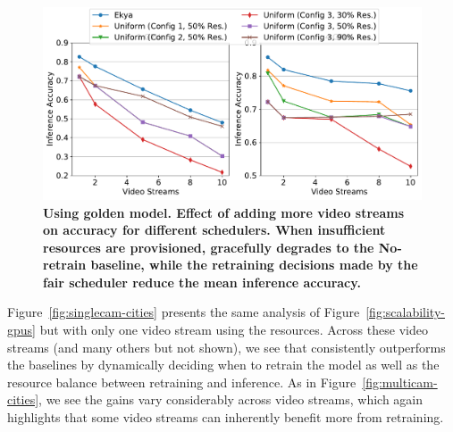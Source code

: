 \begin{figure}
 	\includegraphics[width=\linewidth]{results/scalability/scalability_cams_fixedGPUs_cityscapes_golden_model.pdf}
	\caption{\bf Using golden model. Effect of adding more video streams on accuracy for different schedulers. When insufficient resources are provisioned, \name{} gracefully degrades to the No-retrain baseline, while the retraining decisions made by the fair scheduler reduce the mean inference accuracy.}
	\label{fig:scalability-fixedGPUs-accuracy}
\end{figure}


Figure~\ref{fig:singlecam-cities} presents the same analysis of Figure~\ref{fig:scalability-gpus} but with only one video stream using the resources.
Across these video streams (and many others but not shown), we see that \name consistently outperforms the baselines by dynamically deciding when to retrain the model as well as the resource balance between retraining and inference.
As in Figure~\ref{fig:multicam-cities}, we see the gains vary considerably across video streams, which again highlights that some video streams can inherently benefit more from retraining.%


